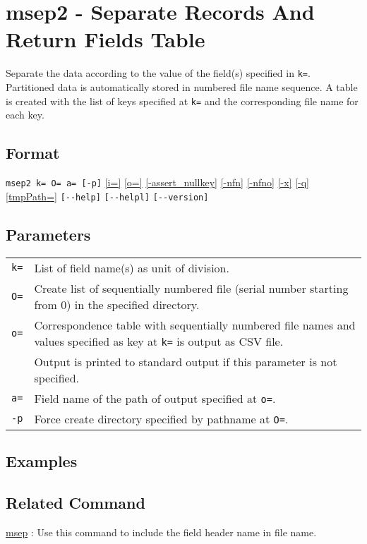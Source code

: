
%

\section{msep2 - Separate Records And Return Fields Table \label{sect:msep2}}
Separate the data according to the value of the field(s) specified in \verb|k=|. Partitioned data is automatically stored in numbered file name sequence. A table is created with the list of keys specified at \verb|k=|  and the corresponding file name for each key. 


\subsection*{Format}
\verb|msep2 k= O= a= [-p]|
\hyperref[sect:option_i]{[i=]}
\hyperref[sect:option_o]{[o=]}
\hyperref[sect:option_assert_nullkey]{[-assert\_nullkey]}
\hyperref[sect:option_nfn]{[-nfn]} 
\hyperref[sect:option_nfno]{[-nfno]}  
\hyperref[sect:option_x]{[-x]}
\hyperref[sect:option_q]{[-q]}
\hyperref[sect:option_option_tmppath]{[tmpPath=]}
\verb|[--help]|
\verb|[--helpl]|
\verb|[--version]|\\

\subsection*{Parameters}
\begin{table}[htbp]
{\small
\begin{tabular}{ll}
\verb|k=|    & List of field name(s) as unit of division. \\
\verb|O=|    & Create list of sequentially numbered file (serial number starting from 0) in the specified directory.\\
\verb|o=|    & Correspondence table with sequentially numbered file names and  values specified as key at \verb|k=| is output as CSV file. \\
		& Output is printed to standard output if this parameter is not specified. \\
\verb|a=|    & Field name of the path of output specified at \verb|o=|.\\
\verb|-p|    & Force create directory specified by pathname at  \verb|O=|.\\

\end{tabular} 
}
\end{table} 


\subsection*{Examples}

\subsection*{Related Command}
\hyperref[sect:msep] {msep} : Use this command to include the field header name in file name.

%
